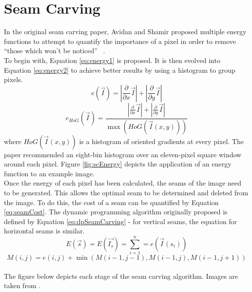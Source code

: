 \chapter{Seam Carving}
\label{app:seamCarving}

\indent \indent
In the original seam carving paper, Avidan and Shamir proposed multiple energy functions to attempt to quantify the importance of a pixel in order to remove ``those which won't be noticed'' ~\cite{SeamCarving}.
\smallskip \\ \indent
To begin with, Equation \ref{eq:energy1} is proposed. It is then evolved into Equation \ref{eq:energy2} to achieve better results by using a histogram to group pixels.
\begin{equation}
    \label{eq:energy1}
    e(\vec{I}) = \left| \frac{\partial}{\partial x} \vec{I} \right| + \left| \frac{\partial}{\partial y} \vec{I} \right|
\end{equation}
\begin{equation}
    \label{eq:energy2}
    e_{\textit{HoG}}(\vec{I}) = \frac{\left| \frac{\partial}{\partial x} \vec{I} \right| + \left| \frac{\partial}{\partial y} \vec{I} \right|}{\max{(\textit{HoG}(\vec{I}(x,y)))}}
\end{equation}
where $\textit{HoG}(\vec{I}(x,y))$ is a histogram of oriented gradients at every pixel. The paper recommended an eight-bin histogram over an eleven-pixel square window around each pixel. Figure \ref{fig:scEnergy} depicts the application of an energy function to an example image.
\smallskip \\ \indent
Once the energy of each pixel has been calculated, the seams of the image need to be generated. This allows the optimal seam to be determined and deleted from the image. To do this, the cost of a seam can be quantified by Equation \ref{eq:seamCost}. The dynamic programming algorithm originally proposed is defined by Equation \ref{eq:dpSeamCarving} - for vertical seams, the equation for horizontal seams is similar.
\begin{equation}
    \label{eq:seamCost}
    E(\vec{s}) = E(\vec{I_s}) = \sum^n_{i=1} = e(\vec{I}(s_i))
\end{equation}
\begin{equation}
    \label{eq:dpSeamCarving}
    M(i, j) = e(i,j) + \min{(M(i-1, j-1), M(i-1, j), M(i-1, j+1))}
\end{equation}
\bigskip \\ \indent
The figure below depicts each stage of the seam carving algorithm. Images are taken from \cite{wikiSeamCarving}.



